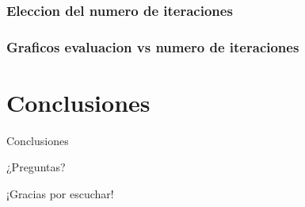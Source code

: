 \documentclass[12pt,center]{beamer}
\begin{document}
  \begin{frame}
    \frametitle{Eleccion del numero de iteraciones}
  \end{frame}
  
  \begin{frame}
    \frametitle{Graficos evaluacion vs numero de iteraciones}
  \end{frame}

\section{Conclusiones}
\begin{frame}{Conclusiones}
\end{frame}



\begin{frame}
 {\Huge ¿Preguntas?}
\end{frame}

\begin{frame}
 {\Huge ¡Gracias por escuchar!}
\end{frame}



% 
% 
% 
% 

\begin{frame}
\begin{figure}[center]
\end{figure}
\end{frame}
\end{document}
